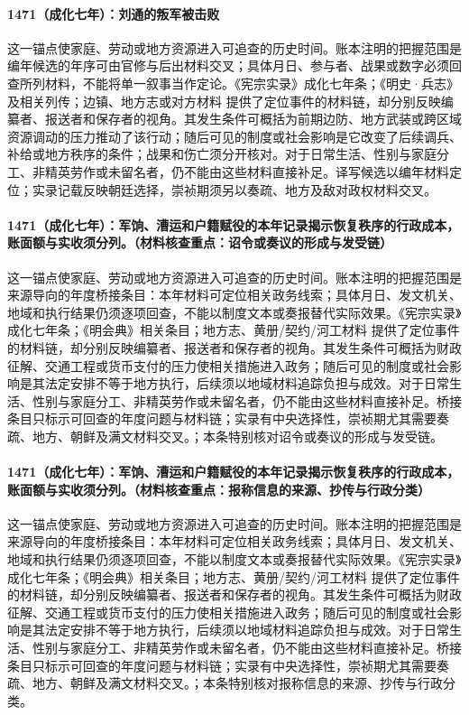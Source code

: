 \paragraph{1471（成化七年）：刘通的叛军被击败} 这一锚点使家庭、劳动或地方资源进入可追查的历史时间。账本注明的把握范围是编年候选的年序可由官修与后出材料交叉；具体月日、参与者、战果或数字必须回查所列材料，不能将单一叙事当作定论。《宪宗实录》成化七年条；《明史·兵志》及相关列传；边镇、地方志或对方材料 提供了定位事件的材料链，却分别反映编纂者、报送者和保存者的视角。其发生条件可概括为前期边防、地方武装或跨区域资源调动的压力推动了该行动；随后可见的制度或社会影响是它改变了后续调兵、补给或地方秩序的条件；战果和伤亡须分开核对。对于日常生活、性别与家庭分工、非精英劳作或未留名者，仍不能由这些材料直接补足。译写候选以编年材料定位；实录记载反映朝廷选择，崇祯期须另以奏疏、地方及敌对政权材料交叉。

\paragraph{1471（成化七年）：军饷、漕运和户籍赋役的本年记录揭示恢复秩序的行政成本，账面额与实收须分列。（材料核查重点：诏令或奏议的形成与发受链）} 这一锚点使家庭、劳动或地方资源进入可追查的历史时间。账本注明的把握范围是来源导向的年度桥接条目：本年材料可定位相关政务线索；具体月日、发文机关、地域和执行结果仍须逐项回查，不能以制度文本或奏报替代实际效果。《宪宗实录》成化七年条；《明会典》相关条目；地方志、黄册/契约/河工材料 提供了定位事件的材料链，却分别反映编纂者、报送者和保存者的视角。其发生条件可概括为财政征解、交通工程或货币支付的压力使相关措施进入政务；随后可见的制度或社会影响是其法定安排不等于地方执行，后续须以地域材料追踪负担与成效。对于日常生活、性别与家庭分工、非精英劳作或未留名者，仍不能由这些材料直接补足。桥接条目只标示可回查的年度问题与材料链；实录有中央选择性，崇祯期尤其需要奏疏、地方、朝鲜及满文材料交叉。；本条特别核对诏令或奏议的形成与发受链。

\paragraph{1471（成化七年）：军饷、漕运和户籍赋役的本年记录揭示恢复秩序的行政成本，账面额与实收须分列。（材料核查重点：报称信息的来源、抄传与行政分类）} 这一锚点使家庭、劳动或地方资源进入可追查的历史时间。账本注明的把握范围是来源导向的年度桥接条目：本年材料可定位相关政务线索；具体月日、发文机关、地域和执行结果仍须逐项回查，不能以制度文本或奏报替代实际效果。《宪宗实录》成化七年条；《明会典》相关条目；地方志、黄册/契约/河工材料 提供了定位事件的材料链，却分别反映编纂者、报送者和保存者的视角。其发生条件可概括为财政征解、交通工程或货币支付的压力使相关措施进入政务；随后可见的制度或社会影响是其法定安排不等于地方执行，后续须以地域材料追踪负担与成效。对于日常生活、性别与家庭分工、非精英劳作或未留名者，仍不能由这些材料直接补足。桥接条目只标示可回查的年度问题与材料链；实录有中央选择性，崇祯期尤其需要奏疏、地方、朝鲜及满文材料交叉。；本条特别核对报称信息的来源、抄传与行政分类。

